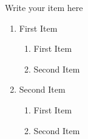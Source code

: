 \documentclass[12pt, a4paper]{article}
\begin{document}
	Write your item here
	\begin{enumerate}
		\item First Item
			\begin{enumerate}
				\item First Item
				\item Second Item
			\end{enumerate}
		\item Second Item
			\begin{enumerate}
				\item First Item
				\item Second Item
			\end{enumerate}
	\end{enumerate}
\end{document}
